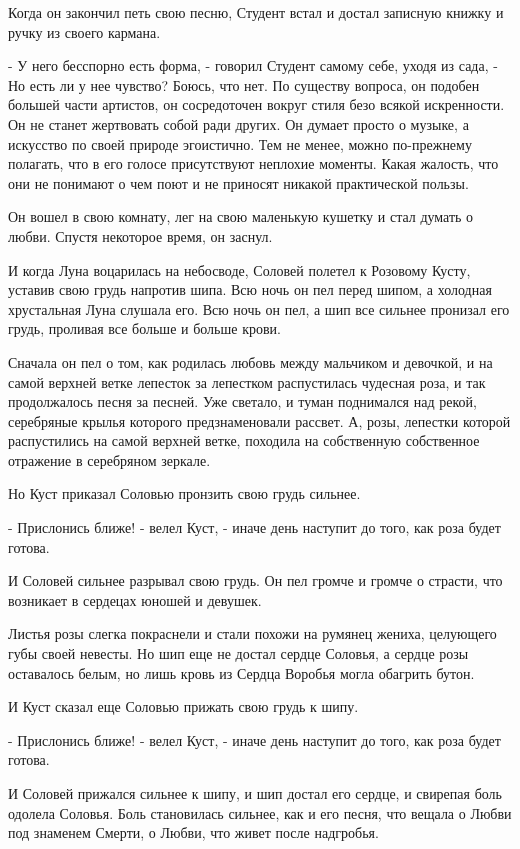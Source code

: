 \documentclass[a4paper]{article}
\theoremstyle{defin}
\theoremstyle{theorem}
\theoremstyle{prop}
\theoremstyle{lemma}
\theoremstyle{ex}
\theoremstyle{col}
\begin{document}
Когда он закончил петь свою песню, Студент встал и достал записную книжку и ручку из своего кармана.

- У него бесспорно есть форма, - говорил Студент самому себе, уходя из сада, - Но есть ли у нее чувство? Боюсь, что нет. По существу вопроса, он подобен большей части артистов, он сосредоточен вокруг стиля безо всякой искренности. Он не станет жертвовать собой ради других. Он думает просто о музыке, а искусство по своей природе эгоистично. Тем не менее, можно по-прежнему полагать, что в его голосе присутствуют неплохие моменты. Какая жалость, что они не понимают о чем поют и не приносят никакой практической пользы.

Он вошел в свою комнату, лег на свою маленькую кушетку и стал думать о любви. Спустя некоторое время, он заснул.

И когда Луна воцарилась на небосводе, Соловей полетел к Розовому Кусту, уставив свою грудь напротив шипа. Всю ночь он пел перед шипом, а холодная хрустальная Луна слушала его. Всю ночь он пел, а шип все сильнее пронизал его грудь, проливая все больше и больше крови.

Сначала он пел о том, как родилась любовь между мальчиком и девочкой, и на самой верхней ветке лепесток за лепестком распустилась чудесная роза, и так продолжалось песня за песней. Уже светало, и туман поднимался над рекой, серебряные крылья которого предзнаменовали рассвет. А, розы, лепестки которой распустились на самой верхней ветке, походила на собственную собственное отражение в серебряном зеркале.

Но Куст приказал Соловью пронзить свою грудь сильнее.

- Прислонись ближе! - велел Куст, - иначе день наступит до того, как роза будет готова.

И Соловей сильнее разрывал свою грудь. Он пел громче и громче о страсти, что возникает в сердецах юношей и девушек.

Листья розы слегка покраснели и стали похожи на румянец жениха, целующего губы своей невесты. Но шип еще не достал сердце Соловья, а сердце розы оставалось белым, но лишь кровь из Сердца Воробья могла обагрить бутон.

И Куст сказал еще Соловью прижать свою грудь к шипу.

- Прислонись ближе! - велел Куст, - иначе день наступит до того, как роза будет готова.

И Соловей прижался сильнее к шипу, и шип достал его сердце, и свирепая боль одолела Соловья. Боль становилась сильнее, как и его песня, что вещала о Любви под знаменем Смерти, о Любви, что живет после надгробья.
\end{document}
